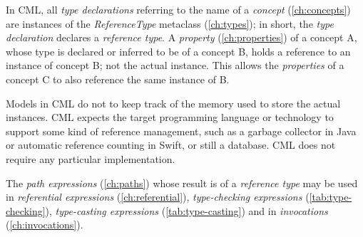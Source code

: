 In CML, all \emph{type declarations}
referring to the name of a \emph{concept} (\ref{ch:concepts})
are instances of the \emph{ReferenceType} metaclass (\ref{ch:types});
in short, the \emph{type declaration} declares a \emph{reference type}.
A \emph{property} (\ref{ch:properties}) of a concept A,
whose type is declared or inferred to be of a concept B,
holds a reference to an instance of concept B; not the actual instance.
This allows the \emph{properties} of a concept C
to also reference the same instance of B.

Models in CML do not to keep track of the memory used
to store the actual instances.
CML expects the target programming language or technology
to support some kind of reference management,
such as a garbage collector in Java or automatic reference counting in Swift,
or still a database.
CML does not require any particular implementation.

The \emph{path expressions} (\ref{ch:paths})
whose result is of a \emph{reference type} may be used
in \emph{referential expressions} (\ref{ch:referential}),
\emph{type-checking expressions} (\ref{tab:type-checking}),
\emph{type-casting expressions} (\ref{tab:type-casting})
and in \emph{invocations} (\ref{ch:invocations}).
